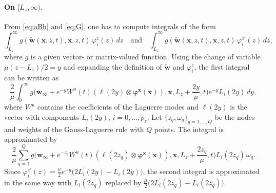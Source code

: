 \documentclass[11pt]{article}
\newcommand{\bw}{\mathbf{w}}
\newcommand{\wt}{\widetilde{\mathbf{w}}}
\newcommand{\bx}{\mathbf{x}}
\begin{document}
	\paragraph{On $[L_z,\infty)$.} From \eqref{eq:aBh} and \eqref{eq:G}, one has to compute integrals of the form
	\[
	\int_{L_z}^\infty g(\wt(\bx,z,t),\bx,z,t)\,\varphi^z_i(z)\,dz\quad\text{and}\quad\int_{L_z}^\infty g(\wt(\bx,z,t),\bx,z,t)\,\varphi^{z\prime}_i(z)\,dz,
	\]
	where $g$ is a given vector- or matrix-valued function. Using the change of variable $\mu(z-L_z)/2=y$ and expanding the definition of $\wt$ and $\varphi^z_i$, the first integral can be written as
	\[
	\frac{2}{\mu}\int_0^\infty g\Big(\bw_\infty+e^{-y}W^u(t)(\bm{\ell}(2y)\otimes\bm{\varphi}^\bx(\bx)),\bx,L_z+\frac{2y}{\mu},t\Big)e^{-y}L_i(2y)\,dy,
	\]
	where $W^u$ contains the coefficients of the Laguerre modes and $\bm{\ell}(2y)$ is the vector with components $L_i(2y)$, $i=0,\dots,p_z$. Let $\{z_q,\omega_q\}_{q=1,\dots,Q}$ be the nodes and weights of the Gauss-Laguerre rule with $Q$ points. The integral is approximated by
	\[
	\frac{2}{\mu}\sum_{q=1}^Qg\Big(\bw_\infty+e^{-z_q}W^u(t)(\bm{\ell}(2z_q)\otimes\bm{\varphi}^\bx(\bx)),\bx,L_z+\frac{2z_q}{\mu},t\Big)L_i(2z_q)\,\omega_q.
	\]
	Since $\varphi^{z\prime}_i(z)=\frac{\mu}{2}e^{-y}\big(2L_i^\prime(2y)-L_i(2y)\big)$, the second integral is approximated in the same way with $L_i(2z_q)$ replaced by $\frac{\mu}{2}\big(2L_i^\prime(2z_q)-L_i(2z_q)\big)$.
	
\end{document}
